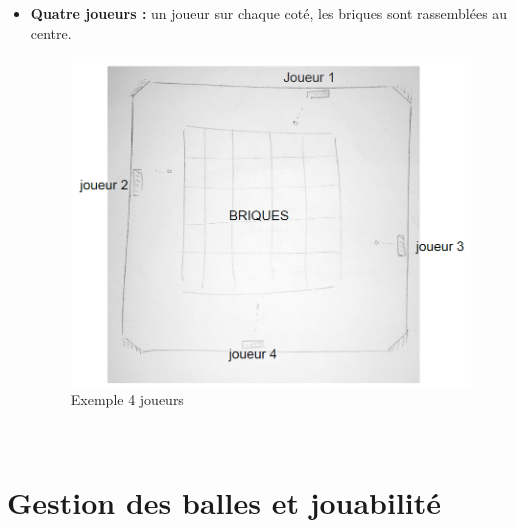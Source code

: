 \documentclass[12pt]{article}
\begin{document}
\begin{itemize}
		
	\item \textbf{Quatre joueurs : }un joueur sur chaque coté, les briques sont rassemblées au centre.\\
	\begin{figure}[!htp]
  			\caption{\label{étiquette} Exemple 4 joueurs}
  			\centerline{\includegraphics[scale=0.7]{multi_4_joueurs}}
	\end{figure}
	\end{itemize}
	~\\
	
	
\section{Gestion des balles et jouabilité}
\end{document}
